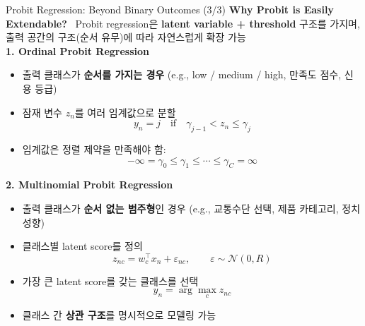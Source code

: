 \documentclass[xcolor=dvipsnames,t,9pt]{beamer}
\begin{document}
\begin{frame}{Probit Regression: Beyond Binary Outcomes (3/3)}
\vspace{-0.3em}
    \textbf{Why Probit is Easily Extendable?} \, Probit regression은 \textbf{latent variable + threshold} 구조를 가지며, 출력 공간의 구조(순서 유무)에 따라 자연스럽게 확장 가능 \\
    \vspace{0.5em}
    \textbf{1. Ordinal Probit Regression}
    \begin{itemize}
        \item 출력 클래스가 \textbf{순서를 가지는 경우} (e.g., low / medium / high, 만족도 점수, 신용 등급)
        \item 잠재 변수 $z_n$를 여러 임계값으로 분할
        \[
        y_n = j \quad \text{if} \quad \gamma_{j-1} < z_n \le \gamma_j
        \]
        \item 임계값은 정렬 제약을 만족해야 함:
        \[
        -\infty = \gamma_0 \le \gamma_1 \le \cdots \le \gamma_C = \infty
        \]
    \end{itemize}
    \vspace{0.3em}
    \textbf{2. Multinomial Probit Regression}
    \begin{itemize}
        \item 출력 클래스가 \textbf{순서 없는 범주형}인 경우 (e.g., 교통수단 선택, 제품 카테고리, 정치 성향)
        \item 클래스별 latent score를 정의
        \[
        z_{nc} = w_c^\top x_n + \varepsilon_{nc},
        \qquad \varepsilon \sim \mathcal{N}(0, R)
        \]
        \item 가장 큰 latent score를 갖는 클래스를 선택
        \[
        y_n = \arg\max_c z_{nc}
        \]
        \item 클래스 간 \textbf{상관 구조}를 명시적으로 모델링 가능
    \end{itemize}
    
\end{frame}

\end{document}
